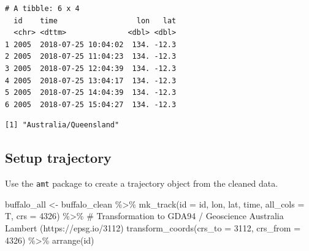 \documentclass[
  letterpaper,
  DIV=11,
  numbers=noendperiod]{scrartcl}
\newenvironment{Shaded}{\begin{snugshade}}{\end{snugshade}}
\newcommand{\AttributeTok}[1]{\textcolor[rgb]{0.40,0.45,0.13}{#1}}
\newcommand{\CommentTok}[1]{\textcolor[rgb]{0.37,0.37,0.37}{#1}}
\newcommand{\DecValTok}[1]{\textcolor[rgb]{0.68,0.00,0.00}{#1}}
\newcommand{\FunctionTok}[1]{\textcolor[rgb]{0.28,0.35,0.67}{#1}}
\newcommand{\NormalTok}[1]{\textcolor[rgb]{0.00,0.23,0.31}{#1}}
\newcommand{\OtherTok}[1]{\textcolor[rgb]{0.00,0.23,0.31}{#1}}
\newcommand{\SpecialCharTok}[1]{\textcolor[rgb]{0.37,0.37,0.37}{#1}}
\begin{document}
\begin{verbatim}
# A tibble: 6 x 4
  id    time                  lon   lat
  <chr> <dttm>              <dbl> <dbl>
1 2005  2018-07-25 10:04:02  134. -12.3
2 2005  2018-07-25 11:04:23  134. -12.3
3 2005  2018-07-25 12:04:39  134. -12.3
4 2005  2018-07-25 13:04:17  134. -12.3
5 2005  2018-07-25 14:04:39  134. -12.3
6 2005  2018-07-25 15:04:27  134. -12.3
\end{verbatim}

\begin{Shaded}
\end{Shaded}

\begin{verbatim}
[1] "Australia/Queensland"
\end{verbatim}

\begin{Shaded}
\end{Shaded}

\subsection{Setup trajectory}\label{setup-trajectory}

Use the \texttt{amt} package to create a trajectory object from the
cleaned data.

\begin{Shaded}
\begin{Highlighting}[]
\NormalTok{buffalo\_all }\OtherTok{\textless{}{-}}\NormalTok{ buffalo\_clean }\SpecialCharTok{\%\textgreater{}\%} \FunctionTok{mk\_track}\NormalTok{(}\AttributeTok{id =}\NormalTok{ id,}
\NormalTok{                                          lon,}
\NormalTok{                                          lat, }
\NormalTok{                                          time, }
                                          \AttributeTok{all\_cols =}\NormalTok{ T,}
                                          \AttributeTok{crs =} \DecValTok{4326}\NormalTok{) }\SpecialCharTok{\%\textgreater{}\%} 
  \CommentTok{\# Transformation to GDA94 / Geoscience Australia Lambert (https://epsg.io/3112)}
  \FunctionTok{transform\_coords}\NormalTok{(}\AttributeTok{crs\_to =} \DecValTok{3112}\NormalTok{, }\AttributeTok{crs\_from =} \DecValTok{4326}\NormalTok{) }\SpecialCharTok{\%\textgreater{}\%} \FunctionTok{arrange}\NormalTok{(id) }
\end{Highlighting}
\end{Shaded}
\end{document}
